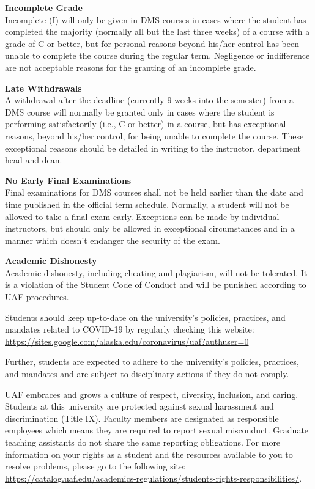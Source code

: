 \documentclass[12pt]{article}
\renewcommand{\emph}[1]{\textsf{\textbf{#1}}}
\newcommand{\localhead}[1]{\par\smallskip\textbf{#1}\nobreak\\}%
\def\subheading#1{\localhead{\emph{#1}}}
\begin{document}
\subheading{Incomplete Grade} 
Incomplete (I) will only be given in
  DMS courses in cases where
  the student has completed the majority (normally all but the last
  three weeks) of a course with a grade of C or better, but for
  personal reasons beyond his/her control has been unable to complete
  the course during the regular term. Negligence or indifference are
  not acceptable reasons for the granting of an incomplete
  grade. 

\subheading{Late Withdrawals} 
A withdrawal after the deadline
  (currently 9 weeks into the semester) from a DMS course will
  normally be granted only in cases where the student is performing
  satisfactorily (i.e., C or better) in a course, but has exceptional
  reasons, beyond his/her control, for being unable to complete the
  course. These exceptional reasons should be detailed in writing to
  the instructor, department head and dean.

\subheading{No Early Final Examinations}
Final examinations for DMS
  courses shall not be held earlier than the date and time published
  in the official term schedule. Normally, a student will not be
  allowed to take a final exam early. Exceptions can be made by
  individual instructors, but should only be allowed in exceptional
  circumstances and in a manner which doesn't endanger the security of
  the exam.

\subheading{Academic Dishonesty}
Academic dishonesty, including cheating and plagiarism, will not
be tolerated.  It is a violation of the Student Code of Conduct
and will be punished according to UAF procedures.

 
  Students should keep up-to-date on the university's policies, practices, and mandates related to COVID-19 by regularly checking this website: \url{https://sites.google.com/alaska.edu/coronavirus/uaf?authuser=0}

Further, students are expected to adhere to the university's policies, practices, and mandates and are subject to disciplinary actions if they do not comply.

 UAF embraces and grows a culture of respect, diversity, inclusion, and caring. Students at this university are protected against sexual harassment and discrimination (Title IX). Faculty members are designated as responsible employees which means they are required to report sexual misconduct. Graduate teaching assistants do not share the same reporting obligations. For more information on your rights as a student and the resources available to you to resolve problems, please go to the following site: \url{https://catalog.uaf.edu/academics-regulations/students-rights-responsibilities/}.
\end{document}
